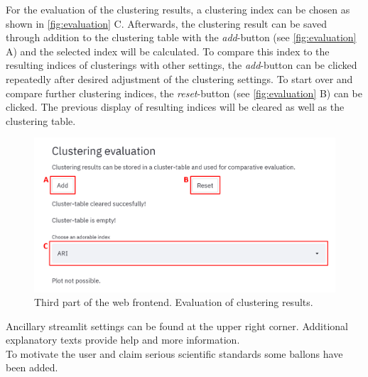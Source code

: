 For the evaluation of the clustering results, a clustering index can be chosen as shown in \autoref{fig:evaluation} C. Afterwards, the clustering result can be saved through addition to the clustering table with the \textit{add}-button (see \autoref{fig:evaluation} A) and the selected index will be calculated. To compare this index to the resulting indices of clusterings with other settings, the \textit{add}-button can be clicked repeatedly after desired adjustment of the clustering settings. To start over and compare further clustering indices, the \textit{reset}-button (see \autoref{fig:evaluation} B) can be clicked. The previous display of resulting indices will be cleared as well as the clustering table. 
\begin{figure}[H]
	\centering
	\includegraphics[width=\linewidth]{modules/web_frontend/evaluation_letters}
	\caption{Third part of the web frontend. Evaluation of clustering results.}\label{fig:evaluation}
\end{figure}


Ancillary streamlit settings can be found at the upper right corner. Additional explanatory texts provide help and more information. \\
To motivate the user and claim serious scientific standards some ballons have been added. 
